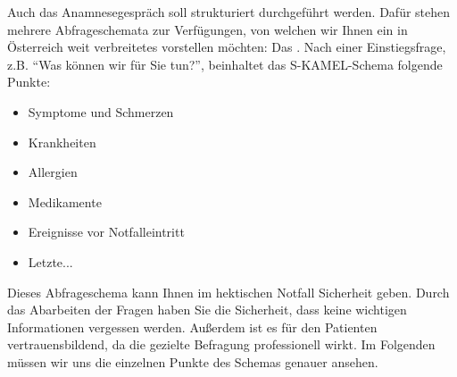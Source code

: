 Auch das Anamnesegespräch soll strukturiert durchgef\"uhrt werden. Daf\"ur stehen mehrere Abfrageschemata zur Verf\"ugungen, von welchen wir Ihnen ein in \"Osterreich weit verbreitetes vorstellen m\"ochten: Das . Nach einer Einstiegsfrage, z.B. "`Was können wir für Sie tun?"', beinhaltet das S-KAMEL-Schema folgende Punkte:
\begin{itemize}
\item Symptome und Schmerzen
\item Krankheiten 
\item Allergien 
\item Medikamente 
\item Ereignisse vor Notfalleintritt 
\item Letzte...
\end{itemize}
Dieses Abfrageschema kann Ihnen im hektischen Notfall Sicherheit geben. Durch das Abarbeiten der Fragen haben Sie die Sicherheit, dass keine wichtigen Informationen vergessen werden. Außerdem ist es für den Patienten vertrauensbildend, da die gezielte Befragung professionell wirkt. Im Folgenden m\"ussen wir uns die einzelnen Punkte des Schemas genauer ansehen.


